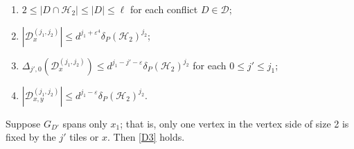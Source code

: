 \documentclass[10pt,a4paper]{amsart}
\newcommand{\cD}{\mathcal{D}}
\newcommand\cH{{\mathcal H}}
\begin{document}
\begin{enumerate}[label=(D\arabic*)]
    \item \label{D1} $2 \leq |D \cap \cH_2| \leq |D| \leq \ell$ for each conflict $D \in \cD$;
    \item \label{D2} $|\cD_x^{(j_1,j_2)}| \leq d^{j_1 + \varepsilon^4} \delta_P(\cH_2)^{j_2}$; 
    \item \label{D3} $\Delta_{j',0}(\cD_x^{(j_1,j_2)}) \leq d^{j_1 - j' - \varepsilon} \delta_P(\cH_2)^{j_2}$ for each $0 \leq j' \leq j_1$;
    \item \label{D4} $|\cD_{x,y}^{(j_1,j_2)}| \leq d^{j_1 - \varepsilon} \delta_P(\cH_2)^{j_2}$.
\end{enumerate}

\begin{claim}
    Suppose $G_{D'}$ spans only $x_1$; that is, only one vertex in the vertex side of size 2 is fixed by the $j'$ tiles or $x$. Then \ref{D3} holds.
\end{claim}
\end{document}
